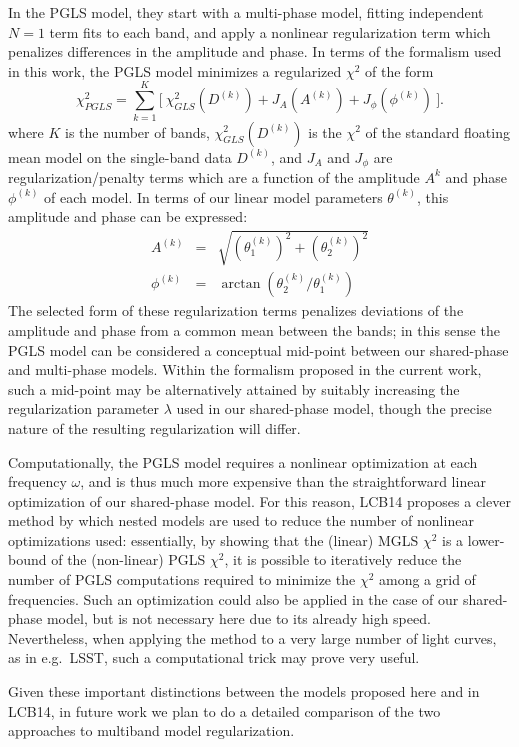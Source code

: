 \documentclass{emulateapj}
\begin{document}
In the PGLS model, they start with a multi-phase model, fitting independent $N=1$ term fits to each band, and apply a nonlinear regularization term which penalizes differences in the amplitude and phase. In terms of the formalism used in this work, the PGLS model minimizes a regularized $\chi^2$ of the form
\begin{equation}
  \chi^2_{PGLS} = \sum_{k=1}^K \bigg[~\chi^2_{GLS}(D^{(k)}) + J_A(A^{(k)}) + J_\phi(\phi^{(k)})~\bigg].
\end{equation}
where $K$ is the number of bands, $\chi^2_{GLS}(D^{(k)})$ is the $\chi^2$ of the standard floating mean model on the single-band data $D^{(k)}$, and $J_A$ and $J_\phi$ are regularization/penalty terms which are a function of the amplitude $A^{k}$ and phase $\phi^{(k)}$ of each model. In terms of our linear model parameters $\theta^{(k)}$, this amplitude and phase can be expressed:
\begin{eqnarray}
 A^{(k)} &=& \sqrt{(\theta_1^{(k)})^2 + (\theta_2^{(k)})^2}\nonumber\\
 \phi^{(k)} &=& \arctan(\theta_2^{(k)} / \theta_1^{(k)})
\end{eqnarray}
The selected form of these regularization terms penalizes deviations of the amplitude and phase from a common mean between the bands; in this sense the PGLS model can be considered a conceptual mid-point between our shared-phase and multi-phase models.
Within the formalism proposed in the current work, such a mid-point may be alternatively attained by suitably increasing the regularization parameter $\lambda$ used in our shared-phase model, though the precise nature of the resulting regularization will differ.

Computationally, the PGLS model requires a nonlinear optimization at each frequency $\omega$, and is thus much more expensive than the straightforward linear optimization of our shared-phase model.
For this reason, LCB14 proposes a clever method by which nested models are used to reduce the number of nonlinear optimizations used: essentially, by showing that the (linear) MGLS $\chi^2$ is a lower-bound of the (non-linear) PGLS $\chi^2$, it is possible to iteratively reduce the number of PGLS computations required to minimize the $\chi^2$ among a grid of frequencies.
Such an optimization could also be applied in the case of our shared-phase model, but is not necessary here due to its already high speed.
Nevertheless, when applying the method to a very large number of light curves, as in e.g.~LSST, such a computational trick may prove very useful.

Given these important distinctions between the models proposed here and in LCB14, in future work we plan to do a detailed comparison of the two approaches to multiband model regularization.
\end{document}
